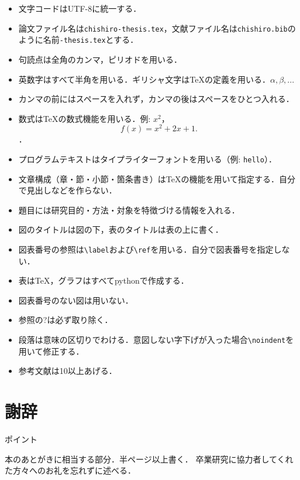 \documentclass[a4j,11pt,report]{jsbook}
\newcommand{\point}[1]{
\begin{itembox}[l]{ポイント}
  #1
\end{itembox}
}
\begin{document}
\begin{itemize}
  \item 文字コードはUTF-8に統一する．
  \item 論文ファイル名は\texttt{chishiro-thesis.tex}，文献ファイル名は\texttt{chishiro.bib}のように名前\texttt{-thesis.tex}とする．
  \item 句読点は全角のカンマ，ピリオドを用いる．
  \item 英数字はすべて半角を用いる．ギリシャ文字は{\TeX}の定義を用いる．$\alpha, \beta, ...$
  \item カンマの前にはスペースを入れず，カンマの後はスペースをひとつ入れる．
  \item 数式は{\TeX}の数式機能を用いる．例: $x^2$，\[f(x) = x^2 + 2x + 1.\]．
  \item プログラムテキストはタイプライターフォントを用いる（例: \texttt{hello}）．
  \item 文章構成（章・節・小節・箇条書き）は{\TeX}の機能を用いて指定する．自分で見出しなどを作らない．
  \item 題目には研究目的・方法・対象を特徴づける情報を入れる．
  \item 図のタイトルは図の下，表のタイトルは表の上に書く．
  \item 図表番号の参照は\verb#\label#および\verb#\ref#を用いる．自分で図表番号を指定しない．
  \item 表は{\TeX}，グラフはすべてpythonで作成する．
  \item 図表番号のない図は用いない．
  \item 参照の?は必ず取り除く．
  \item 段落は意味の区切りでわける．意図しない字下げが入った場合\verb#\noindent#を用いて修正する．
  \item 参考文献は10以上あげる．
\end{itemize}


\chapter*{謝辞 \label{ch:acknowledgement}}
\thispagestyle{empty}
\point{
本のあとがきに相当する部分．半ページ以上書く．
卒業研究に協力者してくれた方々へのお礼を忘れずに述べる．
}

\printbibliography
\end{document}
